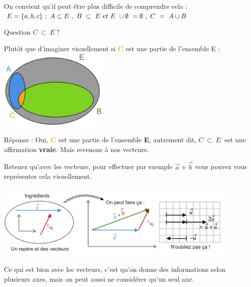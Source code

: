 \documentclass[12pt]{article}
\begin{document}
\begin{tcolorbox}[colback=white!5!white,colframe=blue!75!black,title=Exemple]

\begin{minipage}{.55\linewidth}
On convient qu'il peut être plus difficile de comprendre cela :
$E=\{a,b,c\} \ ;\ A\subset E\ ,\ B\ \subset \ E\ et \\ \ E\ \cup \emptyset \ =\emptyset \ ,\ C\ =\ A\cup B\ $

Question $ C\ \subset \ E\ ?$
\end{minipage}
\begin{minipage}{.44\linewidth}
Plutôt que d'imaginer visuellement si \textcolor{orange}{\textbf{C}} est une partie de l'ensemble E : \\
\includegraphics[width=0.4\textwidth]{DD3.png}
\end{minipage}

Réponse : Oui, \textcolor{orange}{\textbf{C}} est une partie de l'ensemble \textbf{E}, autrement dit,  
$ C\ \subset \ E\ $ est une affirmation \textbf{vraie}. Mais revenons à nos vecteurs.

\end{tcolorbox}

Retenez qu'avec les vecteurs, pour effectuer par exemple $\Vec{a}+\Vec{b}$ vous pouvez vous représenter cela visuellement.

            \begin{center}
            \includegraphics[width=0.9\textwidth]{DD2.png}
            \end{center}

\noindent
Ce qui est bien avec les vecteurs, c'est qu'on donne des informations selon plusieurs axes, mais on peut aussi ne considérer qu'un seul axe. 
\end{document}
